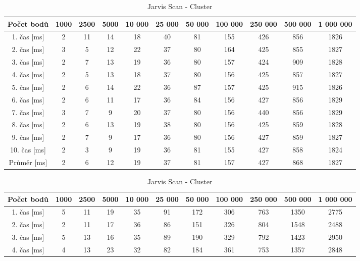 \documentclass{article}
\begin{document}
\begin{center}
\begin{table}[]
	\centering
	\caption{Jarvis Scan - Grid}
	\label{my-label}
	\begin{tabular}{|c|c|c|c|c|c|c|c|c|c|c|}
		\hline 
 	Počet bodů&  1000& 2500 & 5000 & 10 000 & 25 000 & 50 000  & 100 000  & 250 000  & 500 000 & 1 000 000  \\ \hline \hline
 		1. čas [ms]& 2 & 11& 14& 18 &  40&  81&  155&  426&  856& 1826 \\ \hline
 		2. čas [ms]& 3&   5&  12&  22&  37&  80&  164&  425&  855& 1827\\ \hline
 		3. čas [ms]&  2& 7 &  13&  19&  36&  80&  157&  424&  909& 1828 \\ \hline
 		4. čas [ms]&  2&  5&  13&  18&  37&  80&  156&  425&  857& 1827 \\ \hline
 		5. čas [ms]&  2&  6&  14&  22&  36&  87&  157&  425&  915& 1826 \\ \hline
 		6. čas [ms]&  2&  6&  11&  17&  36&  84&  156&  427&  856& 1829 \\ \hline
 		7. čas [ms]&  3&  7&  9&    20&  37&  80&  156&  440&  856& 1829 \\ \hline
 		8. čas [ms]&  2&  6& 13&   19&  38&  80&  156&  425&  859& 1828 \\ \hline
 		9. čas [ms]&  2&  7&  9&    17&  36&  80&  156&  427&  859& 1827\\ \hline
		10. čas [ms]&  2& 3& 9&    19&  36&  81&  155&  427&  858& 1824 \\ \hline \hline
 		Průměr [ms]&  2&  6&  12&  19&  37&  81&  157&  427&  868&  1827\\ \hline
	\end{tabular}
%
	\centering
	\caption{Jarvis Scan - Cluster}
	\label{my-label}
	\begin{tabular}{|c|c|c|c|c|c|c|c|c|c|c|}
		\hline 
 	Počet bodů&  1000& 2500 & 5000 & 10 000 & 25 000 & 50 000  & 100 000  & 250 000  & 500 000 & 1 000 000  \\ \hline \hline
 		1. čas [ms]&  5&  11&  19&  35&  91&  172&  306&  763&  1350&  2775\\ \hline
 		2. čas [ms]&  2&  11&  17&  36&  86&  151&  326&  804&  1548&  2488\\ \hline
 		3. čas [ms]&  5&  13&  16&  35&  89&  190&  329&  792&  1423&  2950\\ \hline
 		4. čas [ms]&  4&  13&  23&  32&  82&  184&  361&  753&  1357&  2848\\ \hline

\end{tabular}
\end{table}
\end{center}
\end{document}
